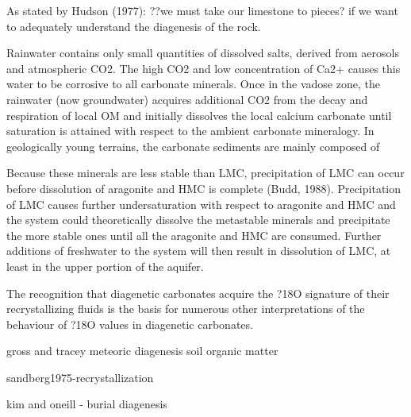 As
stated by Hudson (1977): ??we must take our limestone to pieces? if we want to adequately
understand the diagenesis of the rock.


Rainwater contains only small quantities of dissolved salts, derived from aerosols and
atmospheric CO2. The high CO2 and low concentration of Ca2+ causes this water to be corrosive
to all carbonate minerals. Once in the vadose zone, the rainwater (now groundwater) acquires
additional CO2 from the decay and respiration of local OM and initially dissolves the local
calcium carbonate until saturation is attained with respect to the ambient carbonate
mineralogy. In geologically young terrains, the carbonate sediments are mainly composed of

Because these minerals are less stable than LMC, precipitation of LMC can
occur before dissolution of aragonite and HMC is complete (Budd, 1988). Precipitation of LMC
causes further undersaturation with respect to aragonite and HMC and the system could
theoretically dissolve the metastable minerals and precipitate the more stable ones until all the
aragonite and HMC are consumed. Further additions of freshwater to the system will then
result in dissolution of LMC, at least in the upper portion of the aquifer.

The recognition that diagenetic
carbonates acquire the ?18O signature of their recrystallizing fluids is the basis for numerous
other interpretations of the behaviour of ?18O values in diagenetic carbonates.

gross and tracey meteoric diagenesis soil organic matter

sandberg1975-recrystallization

kim and oneill - burial diagenesis